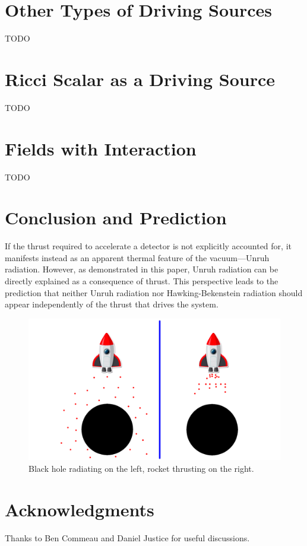 \documentclass[12pt,a4paper]{article}
\begin{document}
\section{Other Types of Driving Sources}
TODO
\section{Ricci Scalar as a Driving Source}
TODO
\section{Fields with Interaction}
TODO

\section{Conclusion and Prediction}
If the thrust required to accelerate a detector is not explicitly accounted for, it manifests instead as an apparent thermal feature of the vacuum—Unruh radiation. However, as demonstrated in this paper, Unruh radiation can be directly explained as a consequence of thrust. This perspective leads to the prediction that neither Unruh radiation nor Hawking-Bekenstein radiation should appear independently of the thrust that drives the system.

\begin{figure}[h]
\centering
\includegraphics[scale=0.5]{rocket.png}
\caption{Black hole radiating on the left, rocket thrusting on the right.}
\label{rocket}
\end{figure}

\section{Acknowledgments}
Thanks to Ben Commeau and Daniel Justice for useful discussions.



\end{document}
